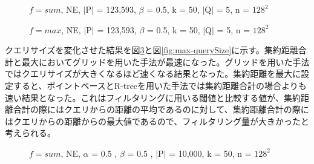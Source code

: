 \documentclass{deimj}
\begin{document}
\begin{figure}[H]
	\centering
    \caption{$f=sum$, NE, $\mid$P$\mid$ = 123,593, $\beta$ = 0.5, k = 50, $\mid$Q$\mid$ = 5, n = $128^2$}
    \label{fig:sum-alpha}
\end{figure}

\begin{figure}[H]
	\centering
    \caption{$f=max$, NE, $\mid$P$\mid$ = 123,593, $\beta$ = 0.5,  k = 50, $\mid$Q$\mid$ = 5, n = $128^2$}
    \label{fig:max-alpha}
\end{figure}

クエリサイズを変化させた結果を図\ref{fig:sum-querySize}と図\ref{fig:max-querySize}に示す。集約距離合計と最大においてグリッドを用いた手法が最速になった。グリッドを用いた手法ではクエリサイズが大きくなるほど速くなる結果となった。集約距離を最大に設定すると、ポイントベースとR-treeを用いた手法では集約距離合計の場合よりも速い結果となった。これはフィルタリングに用いる閾値と比較する値が、集約距離合計の際にはクエリからの距離の平均であるのに対して、集約距離合計の際にはクエリからの距離からの最大値であるので、フィルタリング量が大きかったと考えられる。

\begin{figure}[H]
	\centering
    \caption{$f=sum$, NE, $\alpha$ = 0.5 , $\beta$ = 0.5 , $\mid$P$\mid$ = 10,000, k = 50, n = $128^2$}
    \label{fig:sum-querySize}
\end{figure}
\end{document}
